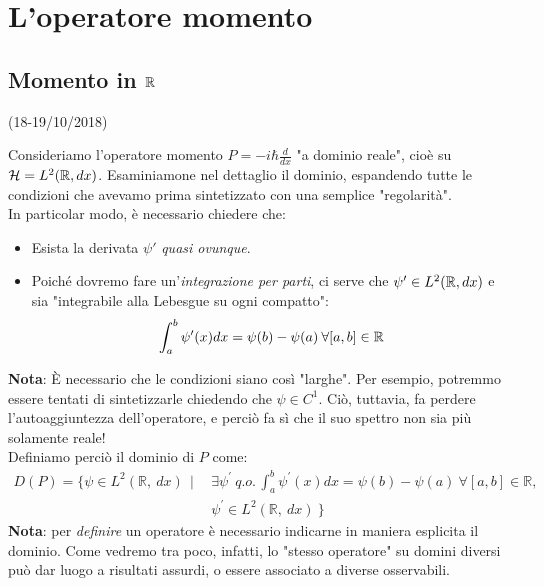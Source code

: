 \documentclass[../../FisicaTeorica.tex]{subfiles}
\begin{document}
\section{L'operatore momento}
\subsection{Momento in $\mathbb{R}$}
\begin{center}
    \small{(18-19/10/2018)}
\end{center}
Consideriamo l'operatore momento $P=-i\hbar \frac{d}{dx}$ "a dominio reale", cioè su $\mathcal{H} = L^2(\bm{\mathbb{R}}, dx)$. Esaminiamone nel dettaglio il dominio, espandendo tutte le condizioni che avevamo prima sintetizzato con una semplice "regolarità".\\
In particolar modo, è necessario chiedere che:
\begin{itemize}
    \item Esista la derivata $\psi'$ \textit{quasi ovunque}.
    \item Poiché dovremo fare un'\textit{integrazione per parti}, ci serve che $\psi' \in L^2(\mathbb{R}, dx)$ e sia "integrabile alla Lebesgue su ogni compatto":
    \[
    \int_a^b \psi'(x)dx = \psi(b)-\psi(a)\>\forall [a,b]\in \mathbb{R}
    \]
\end{itemize}
\textbf{Nota}: È necessario che le condizioni siano così "larghe". Per esempio, potremmo essere tentati di sintetizzarle chiedendo che $\psi \in C^1$. Ciò, tuttavia, fa perdere l'autoaggiuntezza dell'operatore, e perciò fa sì che il suo spettro non sia più solamente reale!\\
Definiamo perciò il dominio di $P$ come:
\begin{align*}
D\left(P\right)= \big\{\psi\in L^2\left(\mathbb{R},\ dx\right)\ \ |\ \ 
&\exists\psi^\prime\ q.o.\, \int_{a}^{b}{\psi^\prime\left(x\right)dx}=\psi\left(b\right)-\psi\left(a\right)\ \forall\left[a,b\right]\in\mathbb{R},\\
&\psi^\prime\in L^2(\mathbb{R},\ dx)\ \big\}
\end{align*}
\textbf{Nota}: per \textit{definire} un operatore è necessario indicarne in maniera esplicita il dominio. Come vedremo tra poco, infatti, lo "stesso operatore" su domini diversi può dar luogo a risultati assurdi, o essere associato a diverse osservabili.\\
\end{document}
